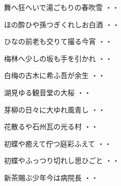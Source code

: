 \vspace{0.6cm}
\begin{shiika}舞へ狂へいで湯ごもりの春吹雪
\hfill{・・}\end{shiika}
\vspace{0.6cm}
\begin{shiika}ほの酔ひや孫つぎくれしお白酒
\hfill{・・}\end{shiika}
\vspace{0.6cm}
\begin{shiika}ひなの前老も交りて撮る今宵
\hfill{・・}\end{shiika}
\vspace{0.6cm}
\begin{shiika}梅林へ少しの坂も手を引かれ
\hfill{・・}\end{shiika}
\vspace{0.6cm}
\begin{shiika}白梅の古木に希ふ吾が余生
\hfill{・・}\end{shiika}
\vspace{0.6cm}
\begin{shiika}湖見ゆる観音堂の大桜
\hfill{・・}\end{shiika}
\vspace{0.6cm}
\begin{shiika}芽柳の日々に大ゆれ風青し
\hfill{・・}\end{shiika}
\vspace{0.6cm}
\begin{shiika}花散るや石州瓦の光る村
\hfill{・・}\end{shiika}
\vspace{0.6cm}
\begin{shiika}初蝶や癒えて佇つ庭彩ふえて
\hfill{・・}\end{shiika}
\vspace{0.6cm}
\begin{shiika}初蝶やふっつり切れし思ひごと
\hfill{・・}\end{shiika}
\vspace{0.6cm}
\begin{shiika}新茶賜ぶ少年今は病院長
\hfill{・・}\end{shiika}
\vspace{0.6cm}
